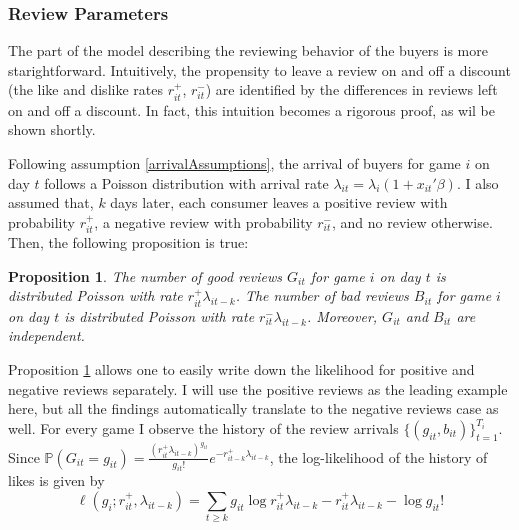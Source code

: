 \documentclass[
  12pt,
  pagebackref]{article}
\newtheorem{proposition}{Proposition}[section]
\newcommand{\PP}[1]{\mathbb{P}\left(#1\right)}
\begin{document}
\hypertarget{review-parameters}{%
\subsubsection{Review Parameters}\label{review-parameters}}

The part of the model describing the reviewing behavior of the buyers is
more starightforward. Intuitively, the propensity to leave a review on
and off a discount (the like and dislike rates \(r_{it}^+\),
\(r_{it}^-\)) are identified by the differences in reviews left on and
off a discount. In fact, this intuition becomes a rigorous proof, as wil
be shown shortly.

Following assumption \ref{arrivalAssumptions}, the arrival of buyers for
game \(i\) on day \(t\) follows a Poisson distribution with arrival rate
\(\lambda_{it} = \lambda_i (1 + x_{it}'\beta)\). I also assumed that,
\(k\) days later, each consumer leaves a positive review with
probability \(r_{it}^+\), a negative review with probability
\(r_{it}^-\), and no review otherwise. Then, the following proposition
is true:

\begin{proposition}\label{poissonReviews}
The number of good reviews $G_{it}$ for game $i$ on day $t$ is distributed Poisson with rate $r_{it}^+\lambda_{it-k}$. The number of bad reviews $B_{it}$ for game $i$ on day $t$ is distributed Poisson with rate $r_{it}^-\lambda_{it-k}$. Moreover, $G_{it}$ and $B_{it}$ are independent.
\end{proposition}

Proposition \ref{poissonReviews} allows one to easily write down the
likelihood for positive and negative reviews separately. I will use the
positive reviews as the leading example here, but all the findings
automatically translate to the negative reviews case as well. For every
game I observe the history of the review arrivals
\(\{(g_{it}, b_{it})\}_{t=1}^{T_i}\). Since
\(\PP{G_{it} = g_{it}} = \frac{ (r_{it}^+\lambda_{it-k} )^{g_{it}} }{g_{it}!} e^{ -r_{it-k}^+\lambda_{it-k} }\),
the log-likelihood of the history of likes is given by
\begin{equation}\label{reviewsLikelihood}
\ell(g_i; r_{it}^+, \lambda_{it-k}) = \sum_{t\ge k} g_{it} \log r_{it}^+\lambda_{it-k} - r_{it}^+\lambda_{it-k} - \log g_{it}!
\end{equation}
\end{document}
